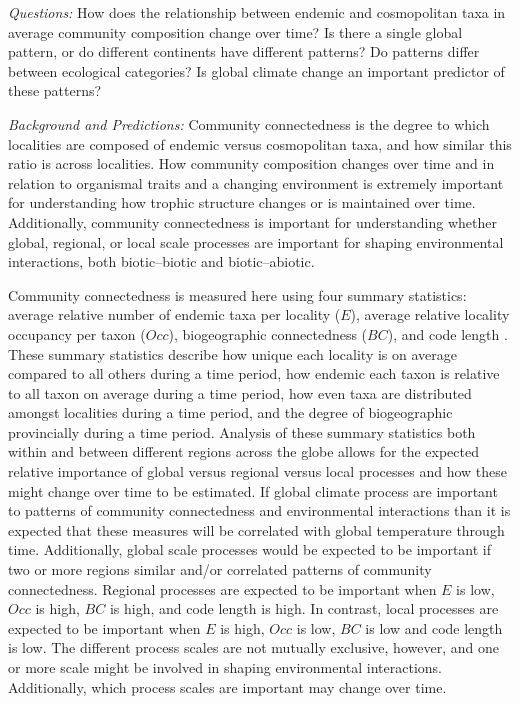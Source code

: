 \documentclass[12pt,letterpaper]{article}
\begin{document}
\textit{Questions:} 
How does the relationship between endemic and cosmopolitan taxa in average community composition change over time? Is there a single global pattern, or do different continents have different patterns? Do patterns differ between ecological categories? Is global climate change an important predictor of these patterns?

\textit{Background and Predictions:}
Community connectedness is the degree to which localities are composed of endemic versus cosmopolitan taxa, and how similar this ratio is across localities. How community composition changes over time and in relation to organismal traits and a changing environment is extremely important for understanding how trophic structure changes or is maintained over time. Additionally, community connectedness is important for understanding whether global, regional, or local scale processes are important for shaping environmental interactions, both biotic--biotic and biotic--abiotic.

Community connectedness is measured here using four summary statistics: average relative number of endemic taxa per locality (\(E\)), average relative locality occupancy per taxon (\(Occ\)), biogeographic connectedness (\(BC\)), and code length \citep{Sidor2013}. These summary statistics describe how unique each locality is on average compared to all others during a time period, how endemic each taxon is relative to all taxon on average during a time period, how even taxa are distributed amongst localities during a time period, and the degree of biogeographic provincially during a time period. Analysis of these summary statistics both within and between different regions across the globe allows for the expected relative importance of global versus regional versus local processes and how these might change over time to be estimated. If global climate process are important to patterns of community connectedness and environmental interactions than it is expected that these measures will be correlated with global temperature through time. Additionally, global scale processes would be expected to be important if two or more regions similar and/or correlated patterns of community connectedness. Regional processes are expected to be important when \(E\) is low, \(Occ\) is high, \(BC\) is high, and code length is high. In contrast, local processes are expected to be important when \(E\) is high, \(Occ\) is low, \(BC\) is low and code length is low. The different process scales are not mutually exclusive, however, and one or more scale might be involved in shaping environmental interactions. Additionally, which process scales are important may change over time.
\end{document}
